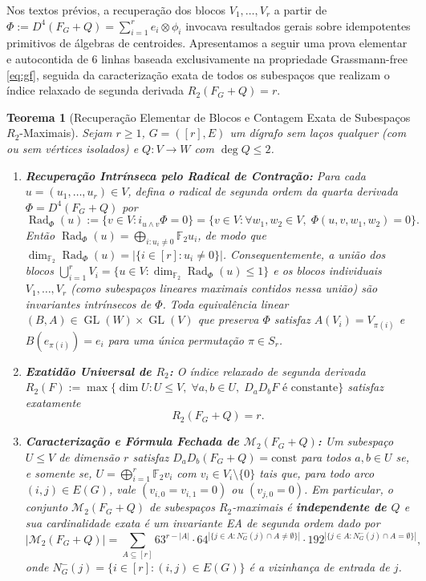 \documentclass[11pt,a4paper]{article}
\newtheorem{theorem}{Teorema}[section]
\theoremstyle{definition}
\theoremstyle{remark}
\newcommand{\F}{\mathbb{F}_2}
\newcommand{\Rad}{\operatorname{Rad}}
\newcommand{\GL}{\operatorname{GL}}
\begin{document}
Nos textos prévios, a recuperação dos blocos $V_1,\dots,V_r$ a partir de $\Phi := D^4(F_G+Q) = \sum_{i=1}^r e_i \otimes \phi_i$ invocava resultados gerais sobre idempotentes primitivos de álgebras de centroides. Apresentamos a seguir uma prova elementar e autocontida de 6 linhas baseada exclusivamente na propriedade Grassmann-free \eqref{eq:gf}, seguida da caracterização exata de todos os subespaços que realizam o índice relaxado de segunda derivada $R_2(F_G+Q) = r$.

\begin{theorem}[Recuperação Elementar de Blocos e Contagem Exata de Subespaços $R_2$-Maximais]\label{thm:block_and_R2}
Sejam $r \ge 1$, $G = ([r], E)$ um dígrafo sem laços qualquer (com ou sem vértices isolados) e $Q : V \to W$ com $\deg Q \le 2$.
\begin{enumerate}
  \item \textbf{Recuperação Intrínseca pelo Radical de Contração:} Para cada $u = (u_1,\dots,u_r) \in V$, defina o radical de segunda ordem da quarta derivada $\Phi = D^4(F_G+Q)$ por
  \[
    \Rad_\Phi(u) := \big\{ v \in V : i_{u\wedge v}\Phi = 0 \big\} = \big\{ v \in V : \forall w_1,w_2 \in V,\; \Phi(u,v,w_1,w_2) = 0 \big\}.
  \]
  Então $\Rad_\Phi(u) = \bigoplus_{i : u_i \neq 0} \F u_i$, de modo que $\dim_{\F} \Rad_\Phi(u) = |\{i \in [r] : u_i \neq 0\}|$. Consequentemente, a união dos blocos $\bigcup_{i=1}^r V_i = \{u \in V : \dim_{\F}\Rad_\Phi(u) \le 1\}$ e os blocos individuais $V_1,\dots,V_r$ (como subespaços lineares maximais contidos nessa união) são invariantes intrínsecos de $\Phi$. Toda equivalência linear $(B, A) \in \GL(W) \times \GL(V)$ que preserva $\Phi$ satisfaz $A(V_i) = V_{\pi(i)}$ e $B(e_{\pi(i)}) = e_i$ para uma única permutação $\pi \in S_r$.
  \item \textbf{Exatidão Universal de $R_2$:} O índice relaxado de segunda derivada $R_2(F) := \max\{\dim U : U \le V,\; \forall a,b \in U,\; D_a D_b F \text{ é constante}\}$ satisfaz exatamente
  \[
    R_2(F_G + Q) = r.
  \]
  \item \textbf{Caracterização e Fórmula Fechada de $\mathcal{M}_2(F_G+Q)$:} Um subespaço $U \le V$ de dimensão $r$ satisfaz $D_a D_b(F_G+Q) = \mathrm{const}$ para todos $a,b \in U$ se, e somente se, $U = \bigoplus_{i=1}^r \F v_i$ com $v_i \in V_i \setminus \{0\}$ tais que, para todo arco $(i,j) \in E(G)$, vale $(v_{i,0} = v_{i,1} = 0)$ ou $(v_{j,0} = 0)$. Em particular, o conjunto $\mathcal{M}_2(F_G+Q)$ de subespaços $R_2$-maximais é \textbf{independente de $Q$} e sua cardinalidade exata é um invariante EA de segunda ordem dado por
  \begin{equation}\label{eq:M2_count}
    |\mathcal{M}_2(F_G + Q)| = \sum_{A \subseteq [r]} 63^{r - |A|} \cdot 64^{|\{j \in A : N_G^-(j) \cap A \neq \emptyset\}|} \cdot 192^{|\{j \in A : N_G^-(j) \cap A = \emptyset\}|},
  \end{equation}
  onde $N_G^-(j) = \{i \in [r] : (i,j) \in E(G)\}$ é a vizinhança de entrada de $j$.
\end{enumerate}
\end{theorem}
\end{document}
